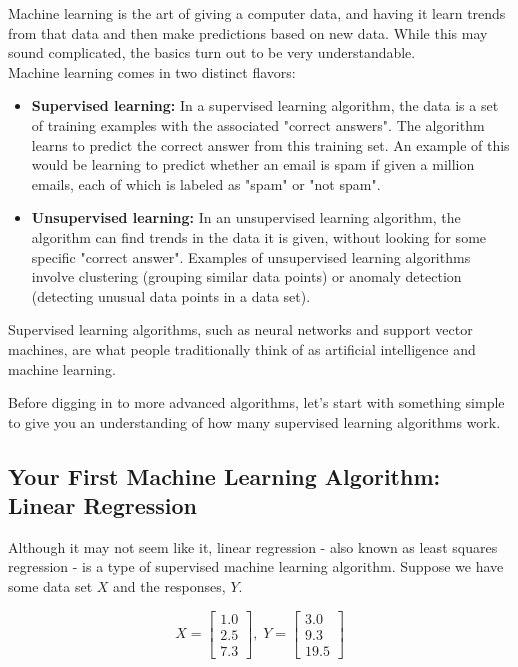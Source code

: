 \documentclass[a4paper]{article}
\begin{document}
Machine learning is the art of giving a computer data, and having it learn trends from that data and
then make predictions based on new data. While this may sound complicated, the basics turn out to be
very understandable.\\

Machine learning comes in two distinct flavors:

\begin{itemize}
    \item
        \textbf{Supervised learning:} In a supervised learning algorithm, the data is a set of training examples
        with the associated "correct answers". The algorithm learns to predict the correct answer from
        this training set. An example of this would be learning to predict whether an email is spam if
        given a million emails, each of which is labeled as "spam" or "not spam".
    \item
        \textbf{Unsupervised learning:} In an unsupervised learning algorithm, the algorithm can find trends in
        the data it is given, without looking for some specific "correct answer". Examples of
        unsupervised learning algorithms involve clustering (grouping similar data points) or anomaly
        detection (detecting unusual data points in a data set).
\end{itemize}

Supervised learning algorithms, such as neural networks and support vector machines, are what people
traditionally think of as artificial intelligence and machine learning.

Before digging in to more advanced algorithms, let's start with something simple to give you an
understanding of how many supervised learning algorithms work.

\subsection*{Your First Machine Learning Algorithm: Linear Regression}

Although it may not seem like it, linear regression - also known as least squares regression - is a
type of supervised machine learning algorithm. Suppose we have some data set $X$ and the responses, $Y$.

\[X = \begin{bmatrix}1.0 \\ 2.5 \\ 7.3 \end{bmatrix},\; Y = \begin{bmatrix}3.0 \\ 9.3 \\ 19.5 \end{bmatrix}\]
\end{document}
